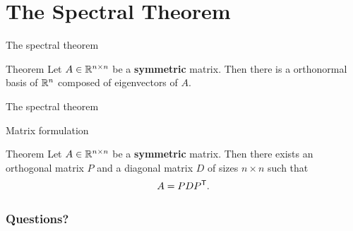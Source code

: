 \documentclass{beamer}
\begin{document}
\section{The Spectral Theorem}

\begin{frame}[t]{The spectral theorem}
	\grid
	
	\vspace{-0.3cm}
	\begin{block}{Theorem}
	Let $A \in \mathbb{R}^{n \times n}$ be a \textbf{symmetric} matrix. Then there is a orthonormal basis of $\mathbb{R}^n$ composed of eigenvectors of $A$.
	\end{block}
\end{frame}

\begin{frame}[t]{The spectral theorem}
	\grid
	
\end{frame}

\begin{frame}[t]{Matrix formulation}
	\grid
	
	\vspace{-0.3cm}
	\begin{block}{Theorem}
	Let $A \in \mathbb{R}^{n \times n}$ be a \textbf{symmetric} matrix. Then there exists an orthogonal matrix $P$ and a diagonal matrix $D$ of sizes $n \times n$ such that
	$$
		A = P D P^{{\sf T}}.
	$$
	\end{block}
\end{frame}


\appendix
\backupbegin
\begin{frame}[t]
	\frametitle{Questions?}
	\grid

	\pause
\end{frame}
\backupend
\end{document}
